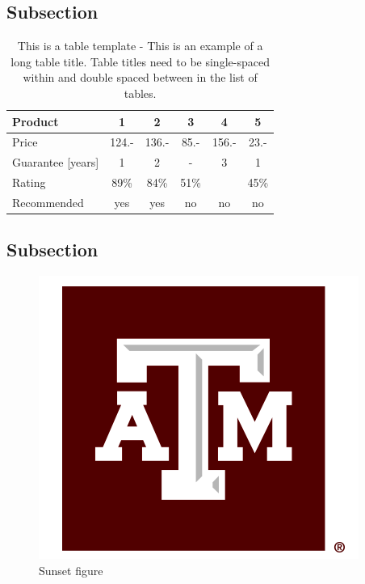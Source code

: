 \subsection{Subsection}
\begin{table}[H]
\centering
\caption{This is a table template - This is an example of a long table title.  Table titles need to be single-spaced within and double spaced between in the list of tables.}
\begin{tabular}{|l|c|c|c|c|c|}
\hline
Product & 1 & 2 & 3 & 4 & 5\\
\hline
Price & 124.- & 136.- & 85.- & 156.- & 23.-\\
Guarantee [years] & 1 & 2 & - & 3 & 1\\
Rating & 89\% & 84\% & 51\% & & 45\%\\
\hline
\hline
Recommended & yes & yes & no & no & no\\
\hline
\end{tabular}
\label{tab:template1}
\end{table}


\subsection{Subsection}
\begin{figure}[H]
\centering
\includegraphics[scale=.50]{Figures/TAMLogoBox.png}
\caption{Sunset figure}
\label{fig:sunset-fig2}
\end{figure}
